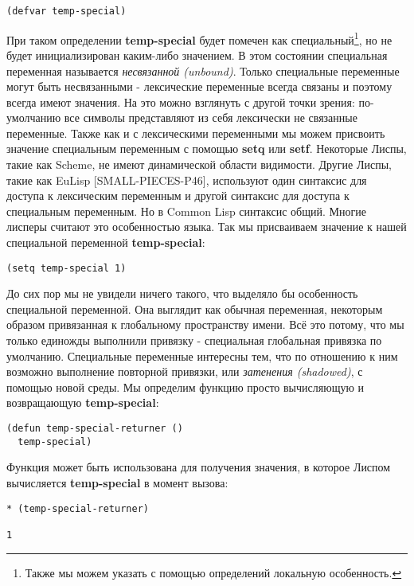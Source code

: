 \begin{verbatim}
(defvar temp-special)
\end{verbatim}

При таком определении \textbf{temp-special} будет помечен как специальный\footnote{Также мы можем указать с помощью определений локальную особенность.}, но не будет инициализирован каким-либо значением. В этом состоянии специальная переменная называется \emph{несвязанной (unbound)}. Только специальные переменные могут быть несвязанными - лексические переменные всегда связаны и поэтому всегда имеют значения. На это можно взглянуть с другой точки зрения: по-умолчанию все символы представляют из себя лексически не связанные переменные. Также как и с лексическими переменными мы можем присвоить значение специальным переменным с помощью \textbf{setq} или \textbf{setf}. Некоторые Лиспы, такие как Scheme, не имеют динамической области видимости. Другие Лиспы, такие как EuLisp [SMALL-PIECES-P46], используют один синтаксис для доступа к лексическим переменным и другой синтаксис для доступа к специальным переменным. Но в Common Lisp синтаксис общий. Многие лисперы считают это особенностью языка. Так мы присваиваем значение к нашей специальной переменной \textbf{temp-special}:

\begin{verbatim}
(setq temp-special 1)
\end{verbatim}

До сих пор мы не увидели ничего такого, что выделяло бы особенность специальной переменной. Она выглядит как обычная переменная, некоторым образом привязанная к глобальному пространству имени. Всё это потому, что мы только единожды выполнили привязку - специальная глобальная привязка по умолчанию. Специальные переменные интересны тем, что по отношению к ним возможно выполнение повторной привязки, или \emph{затенения (shadowed)}, с помощью новой среды. Мы определим функцию просто вычисляющую и возвращающую \textbf{temp-special}:

\begin{verbatim}
(defun temp-special-returner ()
  temp-special)
\end{verbatim}

Функция может быть использована для получения значения, в которое Лиспом вычисляется \textbf{temp-special} в момент вызова:

\begin{verbatim}
* (temp-special-returner)

1
\end{verbatim}

